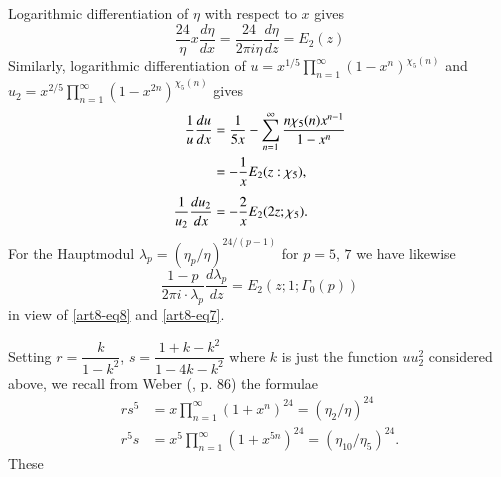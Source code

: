 Logarithmic differentiation of $\eta$ with respect to $x$ gives
\begin{equation}
\frac{24}{\eta}x\dfrac{d\eta}{dx}=\dfrac{24}{2\pi i\eta}\dfrac{d\eta}{dz}=E_{2}(z)\label{art8-eq8}
\end{equation}
Similarly, logarithmic differentiation of $u=x^{1/5}\prod\limits^{\infty}_{n=1}(1-x^{n})^{\chi_{5}(n)}$ and $u_{2}=x^{2/5}\prod\limits^{\infty}_{n=1}(1-x^{2n})^{\chi_{5}(n)}$ gives
\begin{align}
\frac{1}{u}\dfrac{du}{dx} &= \frac{1}{5x}-\sum\limits^{\infty}_{n=1}\frac{n\chi_{5}(n)x^{n-1}}{1-x^{n}}\label{art8-eq9}\\
&= -\frac{1}{x}E_{2}(z:\chi_{5}),\notag\\[4pt]
\frac{1}{u_{2}}\frac{du_{2}}{dx} &= -\frac{2}{x}E_{2}(2z;\chi_{5}).\notag
\end{align}
For the Hauptmodul $\lambda_{p}=(\eta_{p}/\eta)^{24/(p-1)}$ for $p=5$, $7$ we have likewise
\begin{equation}
\frac{1-p}{2\pi i\cdot \lambda_{p}}\frac{d\lambda_{p}}{dz}=E_{2}(z;1;\Gamma_{0}(p))\label{art8-eq10}
\end{equation}
in view of \eqref{art8-eq8} and \eqref{art8-eq7}.

Setting $r=\dfrac{k}{1-k^{2}}$, $s=\dfrac{1+k-k^{2}}{1-4k-k^{2}}$ where $k$ is just the function $uu^{2}_{2}$ considered above, we recall from Weber (\cite{art8-key14}, p. 86) the formulae 
\begin{align*}
rs^{5} &= x\prod\limits^{\infty}_{n=1}(1+x^{n})^{24}=(\eta_{2}/\eta)^{24}\\
r^{5}s &= x^{5}\prod\limits^{\infty}_{n=1}(1+x^{5n})^{24}=(\eta_{10}/\eta_{5})^{24}.
\end{align*}
These\pageoriginale
